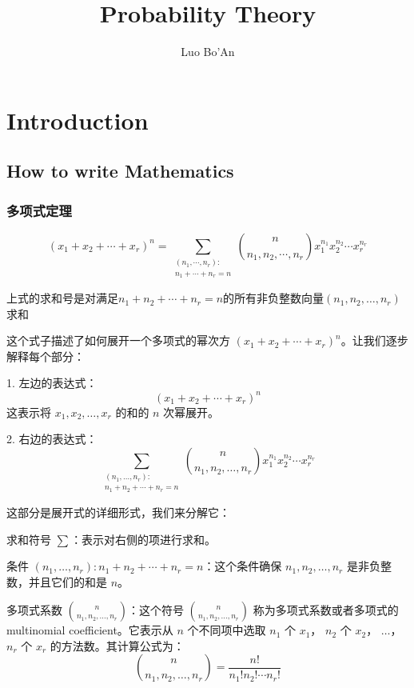 \documentclass{article}
\title{Probability Theory}
\author{Luo Bo'An }
\begin{document}
\maketitle

\begin{abstract}

\end{abstract}

\section{Introduction}



\subsection{How to write Mathematics}

\subsubsection{多项式定理}

$$(x_1+x_2+\cdots+x_{r})^{n}=\sum_{\begin{array}{c}(n_1,\cdots,n_{r}):\\ n_1+\cdots+n_{r}=n\end{array}}\binom{n}{n_{1},n_{2},\cdots,n_{r}}x_1^{n_1}x_2^{n_2}\cdots x_{r}^{n_{r}}$$

上式的求和号是对满足$n_1+n_2+\cdots+n_r=n$的所有非负整数向量$(n_1,n_2,\dots,n_r)$求和


这个式子描述了如何展开一个多项式的幂次方 \((x_1 + x_2 + \cdots + x_r)^n\)。让我们逐步解释每个部分：

1. 左边的表达式：
   \[(x_1 + x_2 + \cdots + x_r)^n\]
   这表示将 \(x_1, x_2, \ldots, x_r\) 的和的 \(n\) 次幂展开。

2. 右边的表达式：
   \[\sum_{\substack{(n_1, \ldots, n_r): \\ n_1 + n_2 + \cdots + n_r = n}} \binom{n}{n_1, n_2, \ldots, n_r} x_1^{n_1} x_2^{n_2} \cdots x_r^{n_r}\]

   这部分是展开式的详细形式，我们来分解它：

   求和符号 \(\sum\)：表示对右侧的项进行求和。
   
   条件 \((n_1, \ldots, n_r): n_1 + n_2 + \cdots + n_r = n\)：这个条件确保 \(n_1, n_2, \ldots, n_r\) 是非负整数，并且它们的和是 \(n\)。

   多项式系数 \(\binom{n}{n_1, n_2, \ldots, n_r}\)：这个符号 \(\binom{n}{n_1, n_2, \ldots, n_r}\) 称为多项式系数或者多项式的 multinomial coefficient。它表示从 \(n\) 个不同项中选取 \(n_1\) 个 \(x_1\)， \(n_2\) 个 \(x_2\)， \(\ldots\)， \(n_r\) 个 \(x_r\) 的方法数。其计算公式为：
   \[\binom{n}{n_1, n_2, \ldots, n_r} = \frac{n!}{n_1! n_2! \cdots n_r!}\]
\end{document}
